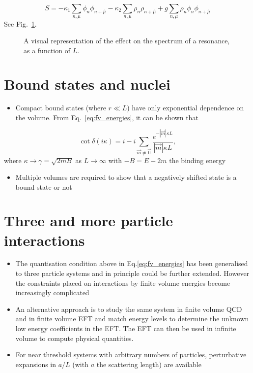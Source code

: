 \begin{equation}
    S = -\kappa_1 \sum_{n,\mu}\phi_n \phi_{n + \hat{\mu}} - \kappa_2 \sum_{n, \mu} \rho_n \rho_{n + \hat{\mu}}  + g \sum_{n, \mu}\rho_n \phi_n \phi_{n + \hat{\mu}}
\end{equation}
See Fig.~\ref{fig:resonance}.
\begin{figure}
\begin{subfigure}{0.4\textwidth}
\end{subfigure}
\begin{subfigure}{0.4\textwidth}
\end{subfigure}
\caption{A visual representation of the effect on the spectrum of a resonance, as a function of $L$.
\label{fig:resonance}}
\end{figure}
\section{Bound states and nuclei}
\begin{itemize}
    \item Compact bound states (where $r \ll L$) have only exponential dependence on the volume. From Eq.~\eqref{eq:fv_energies}, it can be shown that
\end{itemize}
\begin{equation}
    \cot \delta(i \kappa) = i - i \sum_{\vec{m}\neq \vec{0}}\frac{e^{- |\vec{m}| \kappa L}}{|\vec{m}|\kappa L},
\end{equation}
where $\kappa \to \gamma = \sqrt{2 m B}$ as $L \to \infty$ with $-B = E-2m$ the binding energy
\begin{itemize}
    \item Multiple volumes are required to show that a negatively shifted state is a bound state or not
\end{itemize}

\section{Three and more particle interactions}
\begin{itemize}
    \item The quantisation condition above in Eq.\eqref{eq:fv_energies} has been generalised to three particle systems and in principle could be further extended. However the constraints placed on interactions by finite volume energies become increasingly complicated
    \item An alternative approach is to study the same system in finite volume QCD and in finite volume EFT and match energy levels to determine the unknown low energy coefficients in the EFT. The EFT can then be used in infinite volume to compute physical quantities.
    \item For near threshold systems with arbitrary numbers of particles, perturbative expansions in $a/L$ (with $a$ the scattering length) are available
\end{itemize}

